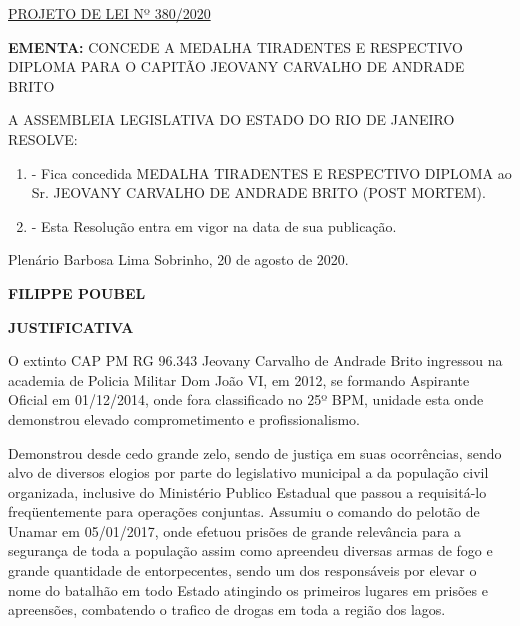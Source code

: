 \documentclass[10pt]{article}
\date{}
\begin{document}
\maketitle
\begin{center}
  \huge
  \vspace{-3cm}\href{http://alerjln1.alerj.rj.gov.br/scpro1923.nsf/9665df2600e114f703256caa00231316/cff26c516c8615470325850b004fe6c5?OpenDocument}{PROJETO DE LEI Nº 380/2020}
\bigskip
\bigskip
\bigskip
  
\end{center}

\textbf{EMENTA:} 
CONCEDE A MEDALHA TIRADENTES E RESPECTIVO DIPLOMA PARA O CAPITÃO JEOVANY CARVALHO DE ANDRADE BRITO








\bigskip

\noindent
A ASSEMBLEIA LEGISLATIVA DO ESTADO DO RIO DE JANEIRO RESOLVE:

\begin{enumerate}[label=Art. \arabic*\textdegree]
\item - Fica concedida MEDALHA TIRADENTES E RESPECTIVO DIPLOMA ao Sr. JEOVANY CARVALHO DE ANDRADE BRITO (POST MORTEM).

\item - Esta Resolução entra em vigor na data de sua publicação.

\end{enumerate}




\begin{center}
  Plenário Barbosa Lima Sobrinho, 20 de agosto de 2020.

   \bigskip

  \textbf{ FILIPPE POUBEL}

  \bigskip

  \textbf{JUSTIFICATIVA}
  \bigskip

\end{center}

  

O extinto CAP PM RG 96.343 Jeovany Carvalho de Andrade Brito ingressou na academia de Policia Militar Dom João VI, em 2012, se formando Aspirante Oficial em 01/12/2014, onde fora classificado no 25º BPM, unidade esta onde demonstrou elevado comprometimento e  profissionalismo.

Demonstrou desde cedo grande zelo, sendo de justiça em suas ocorrências, sendo alvo de diversos elogios por parte do legislativo municipal a da população civil organizada, inclusive do Ministério Publico Estadual que passou a requisitá-lo freqüentemente para operações conjuntas. Assumiu o comando do pelotão de Unamar em 05/01/2017, onde efetuou prisões de grande relevância para a segurança de toda a população assim como apreendeu diversas armas de fogo e grande quantidade de entorpecentes, sendo um dos responsáveis por elevar o nome do batalhão em todo Estado atingindo os primeiros lugares em prisões e apreensões, combatendo o trafico de drogas em toda a região dos lagos.
\end{document}
